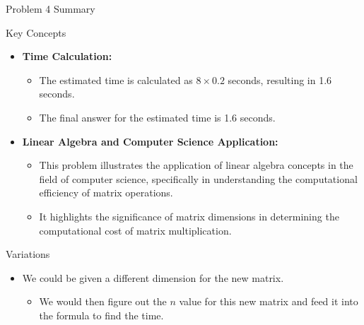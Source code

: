 \begin{summary}{Problem 4 Summary}
\begin{statement}{Key Concepts}
\begin{itemize}
            \item \textbf{Time Calculation:}
            \begin{itemize}
                \item The estimated time is calculated as $8 \times 0.2$ seconds, resulting in 1.6 seconds.
                \item The final answer for the estimated time is 1.6 seconds.
            \end{itemize}
            \item \textbf{Linear Algebra and Computer Science Application:}
            \begin{itemize}
                \item This problem illustrates the application of linear algebra concepts in the field of computer science, specifically in understanding the computational efficiency of matrix operations.
                \item It highlights the significance of matrix dimensions in determining the computational cost of matrix multiplication.
            \end{itemize}
        \end{itemize}
    \end{statement}
    \begin{statement}{Variations}
        \begin{itemize}
            \item We could be given a different dimension for the new matrix.
            \begin{itemize}
                \item We would then figure out the $n$ value for this new matrix and feed it into the formula to find the time.
            \end{itemize}
        \end{itemize}
    \end{statement}
\end{summary}